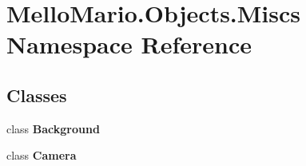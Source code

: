 \section{Mello\+Mario.\+Objects.\+Miscs Namespace Reference}
\label{namespaceMelloMario_1_1Objects_1_1Miscs}
\subsection*{Classes}
\begin{DoxyCompactItemize}
\item 
class \textbf{ Background}
\item 
class \textbf{ Camera}
\end{DoxyCompactItemize}
